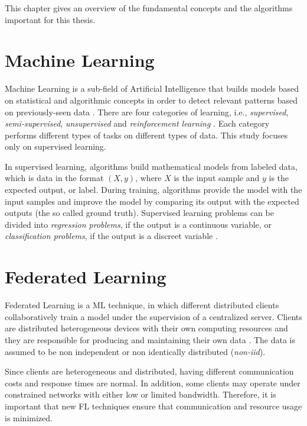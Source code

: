 This chapter gives an overview of the fundamental concepts and the algorithms important for this thesis.

\section{Machine Learning}\label{background:machine_learning}

Machine Learning is a sub-field of Artificial Intelligence that builds models based on statistical and algorithmic concepts in order to detect relevant patterns based on previously-seen data \cite{geron_2019}. There are four categories of learning, i.e., \textit{supervised}, \textit{semi-supervised}, \textit{unsupervised} and \textit{reinforcement learning} \cite{Sarker2021}. Each category performs different types of tasks on different types of data. This study focuses only on supervised learning.

In supervised learning, algorithms build mathematical models from labeled data, which is data in the format $(X, y)$, where $X$ is the input sample and $y$ is the expected output, or label. During training, algorithms provide the model with the input samples and improve the model by comparing its output with the expected outputs (the so called ground truth). Supervised learning problems can be divided into \textit{regression problems}, if the output is a continuous variable, or \textit{classification problems}, if the output is a discreet variable \cite{Sarker2021}.

\section{Federated Learning}\label{background:federated_learning}

Federated Learning is a ML technique, in which different distributed clients collaboratively train a model under the supervision of a centralized server. Clients are distributed heterogeneous devices with their own computing resources and they are responsible for producing and maintaining their own data \cite{9084352}. The data is assumed to be non independent or non identically distributed (\textit{non-iid}).

Since clients are heterogeneous and distributed, having different communication costs and response times are normal. In addition, some clients may operate under constrained networks with either low or limited bandwidth. Therefore, it is important that new FL techniques ensure that communication and resource usage is minimized.

